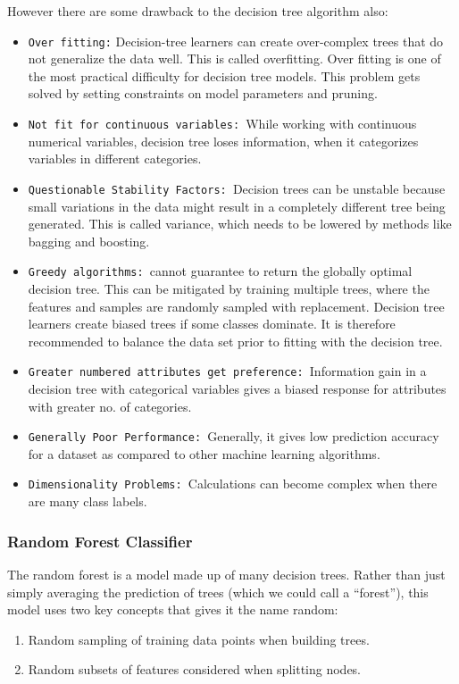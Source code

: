 \documentclass[12pt]{article}
\begin{document}
However there are some drawback to the decision tree algorithm also:
\begin{itemize}
\item
\texttt{Over fitting:} Decision-tree learners can create over-complex trees that do not generalize the data well. This is called overfitting. Over fitting is one of the most practical difficulty for decision tree models. This problem gets solved by setting constraints on model parameters and pruning.

\item
\texttt{Not fit for continuous variables: }While working with continuous numerical variables, decision tree loses information, when it categorizes variables in different categories.
\item
\texttt{Questionable Stability Factors: }Decision trees can be unstable because small variations in the data might result in a completely different tree being generated. This is called variance, which needs to be lowered by methods like bagging and boosting.
\item
\texttt{Greedy algorithms: }cannot guarantee to return the globally optimal decision tree. This can be mitigated by training multiple trees, where the features and samples are randomly sampled with replacement. Decision tree learners create biased trees if some classes dominate. It is therefore recommended to balance the data set prior to fitting with the decision tree.
\item
\texttt{Greater numbered attributes get preference: }Information gain in a decision tree with categorical variables gives a biased response for attributes with greater no. of categories.
\item
\texttt{Generally Poor Performance: }Generally, it gives low prediction accuracy for a dataset as compared to other machine learning algorithms.
\item
\texttt{Dimensionality Problems: }Calculations can become complex when there are many class labels.
\end{itemize}

\subsubsection{Random Forest Classifier}

The random forest is a model made up of many decision trees. Rather than just simply averaging the prediction of trees (which we could call a “forest”), this model uses two key concepts that gives it the name random:
\begin{enumerate}
\item
Random sampling of training data points when building trees.
\item
Random subsets of features considered when splitting nodes.

\end{enumerate}
\end{document}
